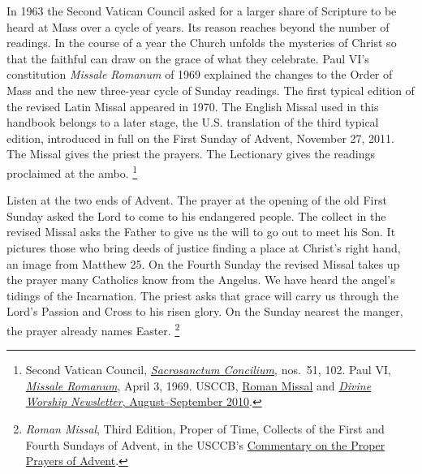In 1963 the Second Vatican Council asked for a larger share of Scripture
to be heard at Mass over a cycle of years. Its reason reaches beyond the
number of readings. In the course of a year the Church unfolds the mysteries
of Christ so that the faithful can draw on the grace of what they celebrate.
Paul VI's constitution \emph{Missale Romanum} of 1969 explained the changes
to the Order of Mass and the new three-year cycle of Sunday readings. The
first typical edition of the revised Latin Missal appeared in 1970. The
English Missal used in this handbook belongs to a later stage, the U.S.
translation of the third typical edition, introduced in full on the First
Sunday of Advent, November 27, 2011. The Missal gives the priest the prayers.
The Lectionary gives the readings proclaimed at the ambo.
\footnote{Second Vatican Council, \href{https://www.vatican.va/archive/hist_councils/ii_vatican_council/documents/vat-ii_const_19631204_sacrosanctum-concilium_en.html}{\emph{Sacrosanctum Concilium}},
nos.~51, 102. Paul VI, \href{https://www.vatican.va/content/paul-vi/en/apost_constitutions/documents/hf_p-vi_apc_19690403_missale-romanum.html}{\emph{Missale Romanum}},
April 3, 1969. USCCB, \href{https://www.usccb.org/prayer-and-worship/the-mass/general-instruction-of-the-roman-missal/roman-missal}{Roman Missal}
and \href{https://www.usccb.org/resources/divine-worship-newsletter-aug-sept-2010}{\emph{Divine Worship Newsletter}, August--September 2010}.}

Listen at the two ends of Advent. The prayer at the opening of the old
First Sunday asked the Lord to come to his endangered people. The collect
in the revised Missal asks the Father to give us the will to go out to meet
his Son. It pictures those who bring deeds of justice finding a place at
Christ's right hand, an image from Matthew 25. On the Fourth Sunday the
revised Missal takes up the prayer many Catholics know from the Angelus.
We have heard the angel's tidings of the Incarnation. The priest asks that
grace will carry us through the Lord's Passion and Cross to his risen glory.
On the Sunday nearest the manger, the prayer already names Easter.
\footnote{\emph{Roman Missal}, Third Edition, Proper of Time, Collects of the
First and Fourth Sundays of Advent, in the USCCB's
\href{https://www.usccb.org/prayer-and-worship/liturgical-year-and-calendar/advent/commentary-on-advent-proper-prayers}{Commentary on the Proper Prayers of Advent}.}


